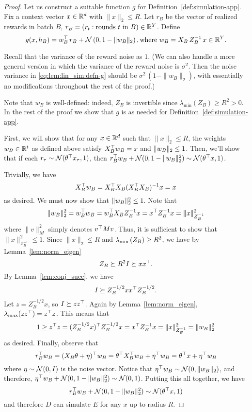 \begin{proof}
Let us construct a suitable function $g$ for Definition~\ref{def:simulation-app}. Fix a context vector $x\in \mathbb{R}^d$ with $\|x\|_2\leq R$. Let $r_B$ be the vector of realized rewards in batch $B$, \ie
    $r_B = (r_t: \text{rounds $t$ in $B$})\in \mathbb{R}^Y$. Define
\begin{align}\label{eq:lem:lin_sim:defn-g}
     g(x, h_B) = w_B^{\top}\, r_B + \mathcal{N}\left(0,1-\|w_B\|_2\right),
     \text{where $w_B = X_B\, Z_B^{-1}\, x\in \mathbb{R}^Y$}.
\end{align}

Recall that the variance of the reward noise as $1$. (We can also handle a more general version in which the variance of the reward noise is $\sigma^2$. Then the noise variance in \eqref{eq:lem:lin_sim:defn-g} should be $\sigma^2\,(1-\|w_B\|_2)$, with essentially no modifications throughout the rest of the proof.)

Note that $w_B$ is well-defined: indeed, $Z_B$ is invertible since
  $\lambda_{\min}(Z_B) \ge R^2>0$.
In the rest of the proof we show that $g$ is as needed for Definition~\ref{def:simulation-app}.


  First, we will show that for any $x \in \mathbb{R}^d$ such that $\|x\|_2 \le R$, the
  weights $w_B \in \mathbb{R}^t$ as defined above satisfy $X_B^{\top} w_B = x$
  and $\|w_B\|_2 \le 1$.
  Then, we'll show that if each $r_\tau \sim \mathcal{N}(\theta ^{\top} x_\tau, 1)$,
  then $r_B^{\top} w_B + \mathcal{N}(0, 1 - \|w_B\|_2^2)
  \sim \mathcal{N}(\theta^{\top} x, 1)$.

  Trivially, we have
  \[
    X_B^{\top} w_B = X_B^{\top} X_B (X_B^{\top} X_B)^{-1} x = x
  \]
  as desired. We must now show that $\|w_B\|^2_2 \le 1$. Note that
  \[
    \|w_B\|_2^2 = w_B^{\top} w_B = w_B^{\top} X_B Z_B^{-1} x =
    x^{\top} Z_B^{-1} x = \|x\|_{Z_B^{-1}}^2
  \]
  where $\|v\|_M^2$ simply denotes $v^{\top} M v$. Thus, it is sufficient to show
  that $\|x\|_{Z_B^{-1}}^2 \le 1$. Since
  $\|x\|_2 \le R$ and $\lambda_{\min}\left(Z_B\right) \ge R^2$, we have by
  Lemma~\ref{lem:norm_eigen}
  \[
    Z_B \succeq R^2 I \succeq xx^{\top}.
  \]
  By Lemma~\ref{lem:conj_succ}, we have
  \[
    I \succeq Z_B^{-1/2} xx^{\top} Z_B^{-1/2}.
  \]
  Let $z = Z_B^{-1/2} x$, so $I \succeq zz^{\top}$. Again by
  Lemma~\ref{lem:norm_eigen}, $\lambda_{\max}(zz^{\top}) = z^{\top} z$. This means
  that
  \[
    1 \ge z^{\top} z = (Z_B^{-1/2}x)^{\top} Z_B^{-1/2} x = x^{\top} Z_B^{-1} x =
    \|x\|_{Z_B^{-1}}^2 = \|w_B\|_2^2
  \]
  as desired.
  Finally, observe that
  \[
    r_B^{\top} w_B = (X_B\theta + \eta)^{\top} w_B = \theta^{\top} X_B^{\top}
    w_B + \eta ^{\top} w_B = \theta^{\top} x + \eta^{\top} w_B
  \]
  where $\eta \sim \mathcal{N}(0, I)$ is the noise vector. Notice that
  $\eta^{\top} w_B \sim \mathcal{N}(0, \|w_B\|_2)$, and therefore,
  $\eta^{\top} w_B + \mathcal{N}(0, 1-\|w_B\|_2^2) \sim \mathcal{N}(0,
  1)$. Putting this all together, we have
  \[
    r_B^{\top} w_B + \mathcal{N}(0, 1-\|w_B\|_2^2) \sim \mathcal{N}(\theta^{\top} x, 1)
  \]
  and therefore $D$ can simulate $E$ for any $x$ up to radius $R$.
\end{proof}



